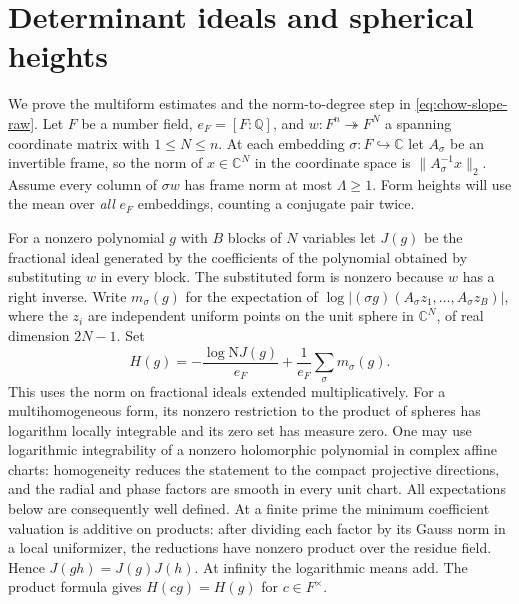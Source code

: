 \section{Determinant ideals and spherical heights}
\label{sec:chow-metric}
We prove the multiform estimates and the norm-to-degree step in
\eqref{eq:chow-slope-raw}. Let \(F\) be a number field, \(e_F=[F:\mathbb Q]\),
and \(w:F^n\twoheadrightarrow F^N\) a spanning coordinate matrix with
\(1\le N\le n\). At each embedding \(\sigma:F\hookrightarrow\mathbb C\)
let \(A_\sigma\) be an invertible frame, so the norm of \(x\in\mathbb C^N\)
in the coordinate space is \(\|A_\sigma^{-1}x\|_2\).
Assume every column of \(\sigma w\) has frame norm at most
\(\Lambda\ge1\). Form heights will use the mean over \emph{all} \(e_F\)
embeddings, counting a conjugate pair twice.

For a nonzero polynomial \(g\) with \(B\) blocks of \(N\) variables let
\(J(g)\) be the fractional ideal generated by the coefficients of the
polynomial obtained by substituting \(w\) in every block. The substituted
form is nonzero because \(w\) has a right inverse. Write \(m_\sigma(g)\)
for the expectation of \(\log|(\sigma g)(A_\sigma z_1,\ldots,A_\sigma z_B)|\),
where the \(z_i\) are independent uniform points on the unit sphere
in \(\mathbb C^N\), of real dimension \(2N-1\). Set
\[
 H(g)=-\frac{\log \mathrm N J(g)}{e_F}
               +\frac1{e_F}\sum_\sigma m_\sigma(g).
\]
This uses the norm on fractional ideals extended multiplicatively.
For a multihomogeneous form, its nonzero restriction to the product of
spheres has logarithm locally integrable and its zero set has measure
zero. One may use logarithmic integrability of a nonzero holomorphic
polynomial in complex affine charts: homogeneity reduces the statement
to the compact projective directions, and the radial and phase factors
are smooth in every unit chart. All expectations below are consequently
well defined. At a finite prime the minimum coefficient valuation is
additive on products: after dividing each factor by its Gauss norm
in a local uniformizer, the reductions have nonzero product over the
residue field. Hence \(J(gh)=J(g)J(h)\). At infinity the logarithmic
means add. The product formula gives \(H(cg)=H(g)\) for \(c\in F^\times\).

